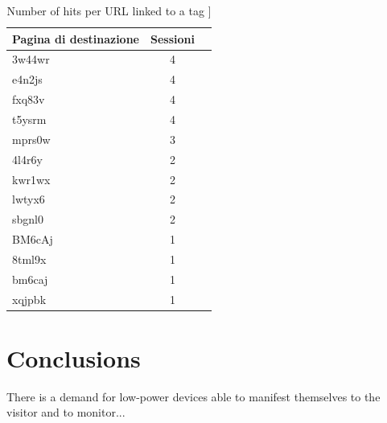 \documentclass[sustainability,article,submit,pdftex,moreauthors]{Definitions/mdpi}
\begin{document}
\begin{table}
\begin{tabular}{|l|c|c|}
\hline
\textbf{Pagina di destinazione} & \textbf{Sessioni} \\
\hline
3w44wr & 4 \\
e4n2js & 4 \\
fxq83v & 4 \\
t5ysrm & 4 \\
mprs0w & 3 \\
4l4r6y & 2 \\
kwr1wx & 2 \\
lwtyx6 & 2 \\
sbgnl0 & 2 \\
BM6cAj & 1 \\
8tml9x & 1 \\
bm6caj & 1 \\
xqjpbk & 1 \\
\hline
\end{tabular}
\caption{Number of hits per URL linked to a tag \label{tab:hits}]}
\end{table}

\section{Conclusions}

There is a demand for low-power devices able to manifest themselves to the visitor and to monitor...



\end{document}
